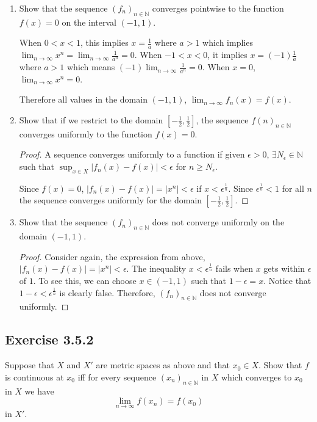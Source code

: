 \documentclass{tufte-book}
\theoremstyle{mytheoremstyle}
\theoremstyle{mylemstyle}
\theoremstyle{mydefstyle}
\begin{document}
\begin{enumerate}

\item Show that the sequence $(f_n)_{n \in \mathbb{N}}$ converges pointwise to the function $f(x) = 0$ on the interval $(-1,1)$.

When $0 < x < 1$, this implies $x = \frac{1}{a}$ where $a > 1$ which implies $\lim_{n \to \infty} x^n = \lim_{n \to \infty} \frac{1}{a^n} = 0$.  When $-1 < x < 0$, it implies $x=(-1)\frac{1}{a}$ where $a > 1$ which means $(-1)\lim_{n \to \infty}\frac{1}{a^n} = 0$.  When $x=0$, $\lim_{n \to \infty} x^n = 0$. 

Therefore all values in the domain $(-1,1)$, $\lim_{n \to \infty}f_n(x) = f(x)$.

\item Show that if we restrict to the domain $[-\frac{1}{2}, \frac{1}{2}]$, the sequence $f(n)_{n \in \mathbb{N}}$ converges uniformly to the function $f(x) = 0$.

\begin{proof}
A sequence converges uniformly to a function if given $\epsilon >0$, $\exists N_\epsilon \in \mathbb{N}$ such that $\sup_{x \in X}|f_n(x) - f(x)| < \epsilon$ for $n \geq N_\epsilon$.

Since $f(x) = 0$, $|f_n(x) - f(x)| = |x^n| < \epsilon$ if $x < \epsilon^\frac{1}{n}$.  Since $\epsilon^\frac{1}{n} < 1$ for all $n$ the sequence converges uniformly for the domain $[-\frac{1}{2}, \frac{1}{2}]$.
\end{proof}

\item Show that the sequence $(f_n)_{n \in \mathbb{N}}$ does not converge uniformly on the domain $(-1,1)$.

\begin{proof}
Consider again, the expression from above, $|f_n(x) - f(x)| = |x^n| < \epsilon$.  The inequality $x < \epsilon^\frac{1}{n}$ fails when $x$ gets within $\epsilon$ of $1$.  To see this, we can choose $x \in (-1,1)$ such that $1-\epsilon = x$. Notice that $1-\epsilon < \epsilon^\frac{1}{n}$ is clearly false.  Therefore, $(f_n)_{n \in \mathbb{N}}$ does not converge uniformly.
\end{proof}

\end{enumerate}


\subsection{Exercise 3.5.2}
Suppose that $X$ and $X'$ are metric spaces as above and that $x_0 \in X$. Show that $f$ is continuous at $x_0$ iff for every sequence $(x_n)_{n \in \mathbb{N}}$ in $X$ which converges to $x_0$ in $X$ we have
\[\lim_{n \to \infty}f(x_n) = f(x_0) \]
in $X'$.
\end{document}
